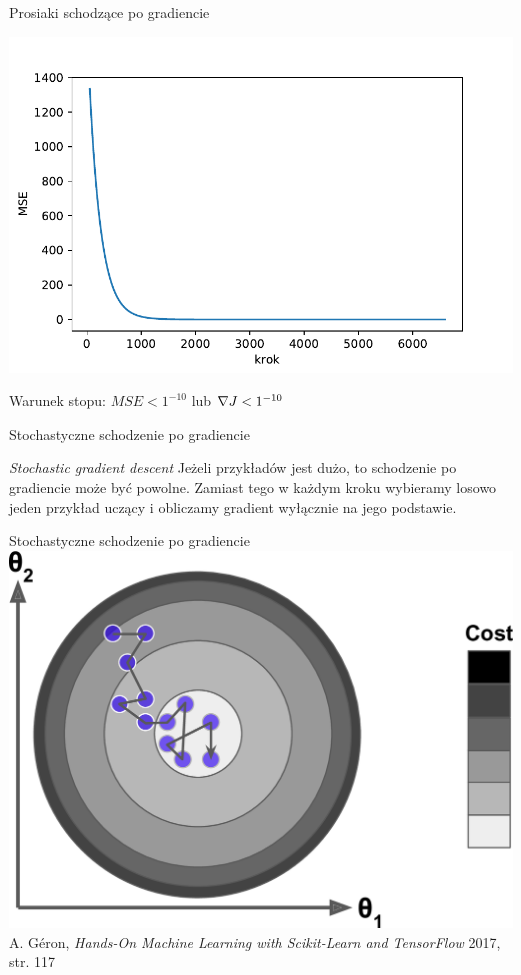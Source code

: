 \documentclass{sa}
\newcommand{\grad}{\ensuremath\nabla}
\begin{document}
\begin{frame}{Prosiaki schodzące po gradiencie}
\begin{center}
\includegraphics[width=.9\textwidth]{grad-prosiaki.pdf}
\end{center}

Warunek stopu: $MSE<1^{-10}$ lub $\grad J<1^{-10}$
\end{frame}

\begin{frame}{Stochastyczne schodzenie po gradiencie}
\begin{block}{\emph{Stochastic gradient descent}}
Jeżeli przykładów jest dużo, to schodzenie po gradiencie może być powolne.
Zamiast tego w każdym kroku wybieramy losowo \alert{jeden} przykład uczący i obliczamy gradient wyłącznie na jego podstawie.
\end{block}
\end{frame}

\begin{frame}{Stochastyczne schodzenie po gradiencie}
\centering
\includegraphics[width=.7\textwidth]{sgd.png}
{\vfill\footnotesize A. Géron, \emph{Hands-On Machine Learning with Scikit-Learn and TensorFlow} 2017, str. 117}
\end{frame}
\end{document}
